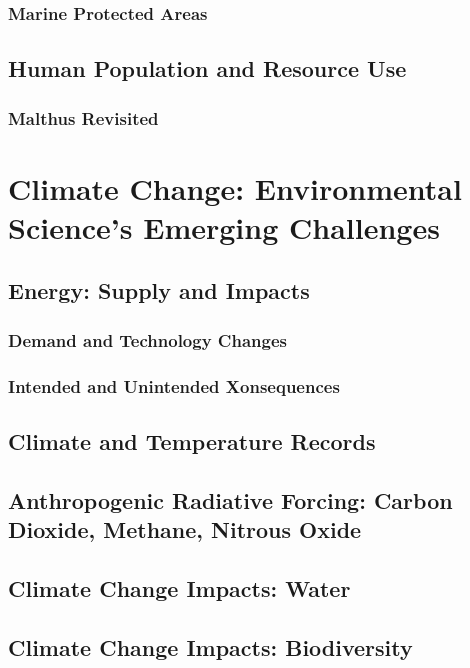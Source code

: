 \documentclass{tufte-book}\usepackage[]{graphicx}\usepackage[]{xcolor}
\begin{document}
\section{Marine Protected Areas}

\chapter{Human Population and Resource Use}

\section{Malthus Revisited}


\part{Climate Change: Environmental Science's Emerging Challenges}

\chapter{Energy: Supply and Impacts}

\section{Demand and Technology Changes}

\section{Intended and Unintended Xonsequences}

\chapter{Climate and Temperature Records}


\chapter{Anthropogenic Radiative Forcing: Carbon Dioxide, Methane, Nitrous Oxide}

\chapter{Climate Change Impacts: Water}

\chapter{Climate Change Impacts: Biodiversity}
\end{document}
